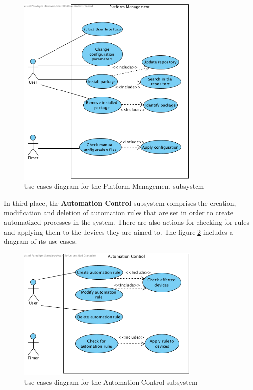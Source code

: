 \begin{figure}
	\centering
	\includegraphics[width=0.8\textwidth]{images/Chapter_06/UC-platform-management.png}
	\caption{Use cases diagram for the Platform Management subsystem}
	\label{fig:UC-platform-management}
\end{figure}

In third place, the \textbf{Automation Control} subsystem comprises the creation, modification and deletion of automation rules that
are set in order to create automatized processes in the system. There are also actions for checking for rules and applying them to 
the devices they are aimed to. The figure \ref{fig:UC-automation-control} includes a diagram of its use cases.

\begin{figure}
	\centering
	\includegraphics[width=0.8\textwidth]{images/Chapter_06/UC-automation-control.png}
	\caption{Use cases diagram for the Automation Control subsystem}
	\label{fig:UC-automation-control}
\end{figure}

